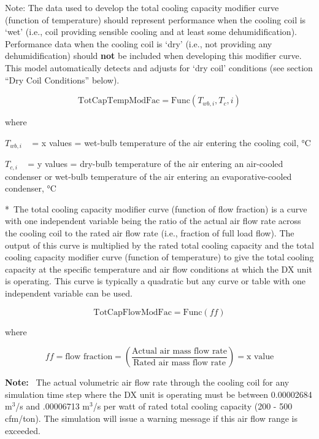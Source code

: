 Note: The data used to develop the total cooling capacity modifier curve (function of temperature) should represent performance when the cooling coil is `wet' (i.e., coil providing sensible cooling and at least some dehumidification). Performance data when the cooling coil is `dry' (i.e., not providing any dehumidification) should \textbf{not} be included when developing this modifier curve. This model automatically detects and adjusts for `dry coil' conditions (see section ``Dry Coil Conditions'' below).

\begin{equation}
\text{TotCapTempModFac} = \text{Func}\left(T_{wb,i},T_c,i\right)
\end{equation}

where

\({T_{wb,i}}\) ~ = x values = wet-bulb temperature of the air entering the cooling coil, °C

\({T_{c,i}}\) ~ = y values = dry-bulb temperature of the air entering an air-cooled condenser or wet-bulb temperature of the air entering an evaporative-cooled condenser, °C

*~The total cooling capacity modifier curve (function of flow fraction) is a curve with one independent variable being the ratio of the actual air flow rate across the cooling coil to the rated air flow rate (i.e., fraction of full load flow). The output of this curve is multiplied by the rated total cooling capacity and the total cooling capacity modifier curve (function of temperature) to give the total cooling capacity at the specific temperature and air flow conditions at which the DX unit is operating. This curve is typically a quadratic but any curve or table with one independent variable can be used.

\begin{equation}
\text{TotCapFlowModFac} = \text{Func}\left(ff\right)
\end{equation}

where

\begin{equation}
ff = \text{flow fraction} = \left( \frac{\text{Actual air mass flow rate}}{\text{Rated air mass flow rate}} \right) = \text{x value}
\end{equation}

\textbf{Note:}~ The actual volumetric air flow rate through the cooling coil for any simulation time step where the DX unit is operating must be between 0.00002684 m\(^{3}\)/s and .00006713 m\(^{3}\)/s per watt of rated total cooling capacity (200 - 500 cfm/ton). The simulation will issue a warning message if this air flow range is exceeded.

